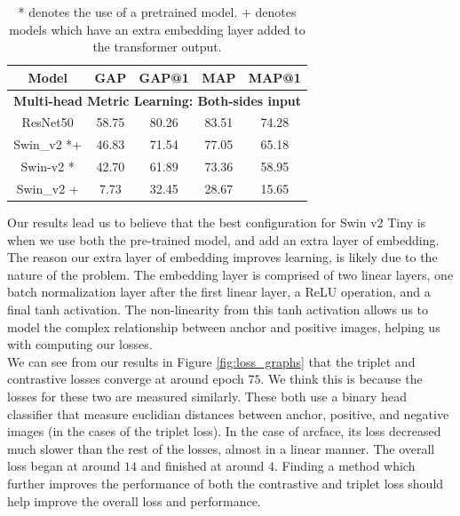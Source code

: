 \documentclass[10pt,twocolumn,letterpaper]{article}
\begin{document}
\begin{table}[h]
    \caption{* denotes the use of a pretrained model.  + denotes models which have an extra embedding layer added to the transformer output.}

    \begin{tabular}{|ccccc|}
    \hline
    \multicolumn{1}{|c|}{Model}       & \multicolumn{1}{c|}{GAP}   & \multicolumn{1}{c|}{GAP@1} & \multicolumn{1}{c|}{MAP}   & MAP@1 \\ \hline
    \multicolumn{5}{|c|}{\textbf{Multi-head Metric Learning: Both-sides input}}                                                      \\ \hline
    \multicolumn{1}{|c|}{ResNet50}    & \multicolumn{1}{c|}{58.75} & \multicolumn{1}{c|}{80.26} & \multicolumn{1}{c|}{83.51} & 74.28 \\ \hline
    \multicolumn{1}{|c|}{Swin\_v2 *+} & \multicolumn{1}{c|}{46.83} & \multicolumn{1}{c|}{71.54} & \multicolumn{1}{c|}{77.05} & 65.18 \\ \hline
    \multicolumn{1}{|c|}{Swin-v2 *}   & \multicolumn{1}{c|}{42.70} & \multicolumn{1}{c|}{61.89} & \multicolumn{1}{c|}{73.36} & 58.95 \\ \hline
    \multicolumn{1}{|c|}{Swin\_v2 +}  & \multicolumn{1}{c|}{7.73}  & \multicolumn{1}{c|}{32.45} & \multicolumn{1}{c|}{28.67} & 15.65 \\ \hline
    \end{tabular}
    \label{tab:results}
\end{table}
Our results lead us to believe that the best configuration for Swin v2 Tiny is when we use both the pre-trained model, and add an extra layer of embedding.
The reason our extra layer of embedding improves learning, is likely due to the nature of the problem.  The embedding layer is comprised of two linear layers, one batch normalization layer after the first linear layer, a ReLU operation, and a final tanh activation. 
The non-linearity from this tanh activation allows us to model the complex relationship between anchor and positive images, helping us with computing our losses. 
\\

We can see from our results in Figure \ref{fig:loss_graphs} that the triplet and contrastive losses converge at around epoch $75$. We think this is because the losses for these two are measured similarly.  These both use a binary head classifier that
measure euclidian distances between anchor, positive, and negative images (in the cases of the triplet loss). \cite{triplet}\cite{contrast} 
In the case of arcface, its loss decreased much slower than the rest of the losses, almost in a linear manner. The overall loss began at around $14$ and finished at around $4$. Finding a method which further improves the performance of both the contrastive and triplet
loss should help improve the overall loss and performance. 
\end{document}
